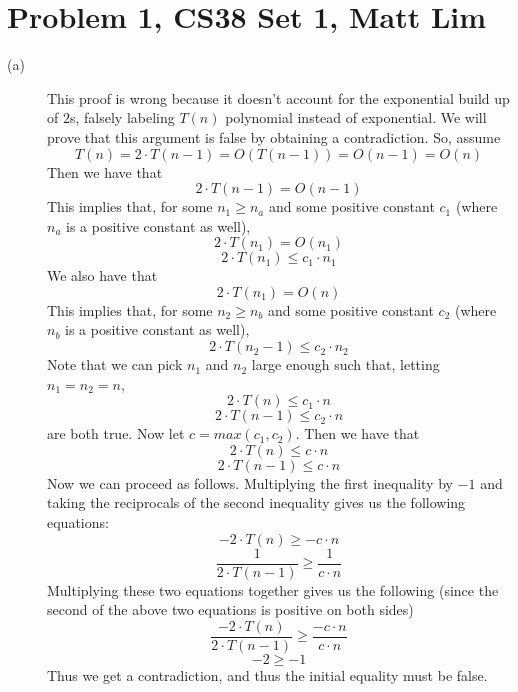 \documentclass{article}
\begin{document}



\section*{Problem 1, CS38 Set 1, Matt Lim}
\begin{description}
    \item[(a)]
        This proof is wrong because it doesn't account for the exponential build
        up of $2$s, falsely labeling $T(n)$ polynomial instead of exponential.
        We will prove that this argument is false by obtaining a contradiction.
        So, assume
        \[ T(n) = 2 \cdot T(n-1) = O(T(n-1)) = O(n-1) = O(n) \]
        Then we have that
        \[ 2 \cdot T(n-1) = O(n-1) \]
        This implies that, for some $n_1 \ge n_a$ and some positive constant $c_1$ (where
        $n_a$ is a positive constant as well),
        \[ 2 \cdot T(n_1) = O(n_1) \]
        \[ 2 \cdot T(n_1) \leq c_1 \cdot n_1 \]
        We also have that
        \[ 2 \cdot T(n_1) = O(n) \]
        This implies that, for some $n_2 \ge n_b$ and some positive constant $c_2$
        (where $n_b$ is a positive constant as well),
        \[ 2 \cdot T(n_2-1) \leq c_2 \cdot n_2 \]
        Note that we can pick $n_1$ and $n_2$ large enough such that, letting $n_1 = n_2 = n$,
        \[ 2 \cdot T(n) \leq c_1 \cdot n \]
        \[ 2 \cdot T(n-1) \leq c_2 \cdot n \]
        are both true. Now let $c = max(c_1, c_2)$. Then we have that
        \[ 2 \cdot T(n) \leq c \cdot n \]
        \[ 2 \cdot T(n-1) \leq c \cdot n \]
        Now we can proceed as follows. Multiplying the first inequality by $-1$
        and taking the reciprocals of the second inequality gives us the
        following equations:
        \[ -2 \cdot T(n) \geq -c \cdot n \]
        \[ \frac{1}{2 \cdot T(n-1)} \geq \frac{1}{c \cdot n} \]
        Multiplying these two equations together gives us the following (since
        the second of the above two equations is positive on both sides)
        \[ \frac{-2 \cdot T(n)}{2 \cdot T(n-1)} \geq \frac{-c \cdot n}{c \cdot n} \]
        \[ -2 \geq -1 \]
        Thus we get a contradiction, and thus the initial equality must be
        false.


\end{description}
\end{document}
